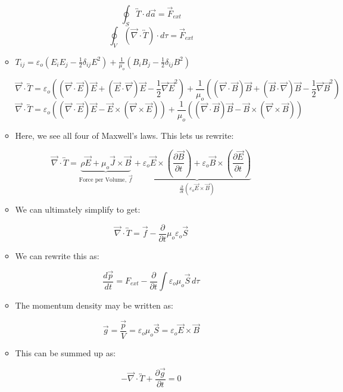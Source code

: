 \begin{itemize}
\begin{itemize}
        $$\oint_S\overleftrightarrow{T}\cdot d\vec{a}=\vec{F}_{ext}$$
        $$\oint_V(\vec{\nabla}\cdot\overleftrightarrow{T})\cdot d\tau=\vec{F}_{ext}$$

      \item $T_{ij}=\varepsilon_o\left( E_iE_j-\frac{1}{2}\delta_{ij}E^2 \right)+\frac{1}{\mu_o}\left( B_iB_j-\frac{1}{2}\delta_{ij}B^2 \right)$

        $$\vec{\nabla}\cdot\overleftrightarrow{T}=\varepsilon_o\left( (\vec{\nabla}\cdot\vec{E} )\vec{E}+(\vec{E}\cdot\vec{\nabla})\vec{E}-\frac{1}{2}\vec{\nabla}\vec{E}^2\right)+\frac{1}{\mu_o}\left( (\vec{\nabla}\cdot\vec{B} )\vec{B}+(\vec{B}\cdot\vec{\nabla})\vec{B}-\frac{1}{2}\vec{\nabla}\vec{B}^2\right)$$
        $$\vec{\nabla}\cdot\overleftrightarrow{T}=\varepsilon_o\left( (\vec{\nabla}\cdot\vec{E} )\vec{E}-\vec{E}\times(\vec{\nabla}\times\vec{E})\right)+\frac{1}{\mu_o}\left( (\vec{\nabla}\cdot\vec{B} )\vec{B}-\vec{B}\times(\vec{\nabla}\times\vec{B})\right)$$

      \item Here, we see all four of Maxwell's laws. This lets us rewrite:

        $$\vec{\nabla}\cdot\overleftrightarrow{T}=\underbrace{\rho\vec{E}+\mu_o\vec{J}\times\vec{B}}_{\text{Force per Volume, $\vec{f}$}}+\underbrace{\varepsilon_o\vec{E}\times\left( \frac{\partial \vec{B}}{\partial t} \right)+\varepsilon_o\vec{B}\times\left( \frac{\partial \vec{E}}{\partial t} \right)}_{\frac{\partial}{\partial t}(\varepsilon_o\vec{E}\times\vec{B})}$$

      \item We can ultimately simplify to get:

        $$\vec{\nabla}\cdot\overleftrightarrow{T}=\vec{f}-\frac{\partial}{\partial t}\mu_o\varepsilon_o\vec{S}$$

      \item We can rewrite this as:

        $$\frac{d\vec{p}}{dt}=F_{ext}-\frac{\partial}{\partial t}\int\varepsilon_o\mu_o\vec{S}\,d\tau$$

      \item The momentum density may be written as:

        $$\vec{g}=\frac{\vec{p}}{V}=\varepsilon_o\mu_o\vec{S}=\varepsilon_o\vec{E}\times\vec{B}$$


      \item This can be summed up as:

        $$-\vec{\nabla}\cdot\overleftrightarrow{T}+\frac{\partial \vec{g}}{\partial t}=0$$


\end{itemize}
\end{itemize}
